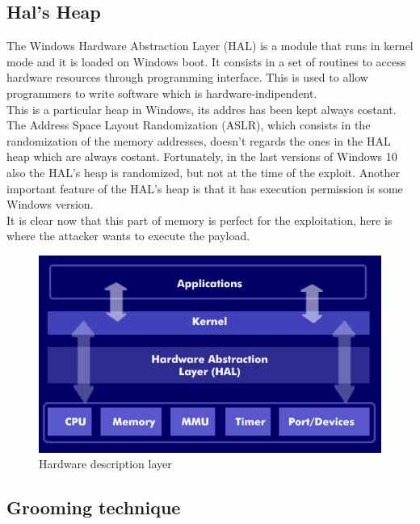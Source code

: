 \subsection{Hal's Heap}
The Windows Hardware Abstraction Layer (HAL) is a module that runs in kernel mode and it is loaded on Windows boot. It consists in a set of routines to access hardware resources
through programming interface. This is used to allow programmers to write software which is hardware-indipendent.\\
This is a particular heap in Windows, its addres has been kept always costant. The Address Space Layout Randomization (ASLR), which consists in the randomization of the memory addresses,
doesn't regards the ones in the HAL heap which are always costant.
Fortunately, in the last versions of Windows 10 also the HAL's heap is randomized, but not at the time of the exploit.
Another important feature of the HAL's heap is that it has execution permission is some Windows version.\\
It is clear now that this part of memory is perfect for the exploitation, here is where the attacker wants to execute the payload.

\begin{figure}[ht!]
    \centering
      \includegraphics[scale=0.5]{images/hal.png}
      \caption{Hardware description layer}
\end{figure}

\subsection{Grooming technique}